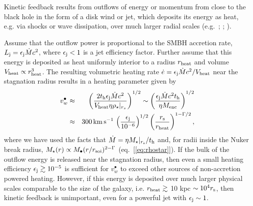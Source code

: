 \documentclass[usenatbib,fleqn]{mn2e}
\begin{document}
Kinetic feedback results from outflows of energy or momentum from close to the black hole in the form of a disk wind or jet, which deposits its energy as heat, e.g. via shocks or wave dissipation, over much larger radial scales (e.g.~\citealt{McNamara&Nulsen07}; \citealt{Novak+11}; \citealt{Gaspari+12}).  

Assume that the outflow power is proportional to the SMBH accretion rate, $L_{\rm j} =
\epsilon_{\rm j} \dot{M}c^{2}$, where $\epsilon_{\rm j} < 1$ is a jet efficiency factor.  Further assume that this energy is deposited as heat uniformly interior to a radius $r_{\rm heat}$ and volume $V_{\rm heat} \propto r_{\rm
heat}^{3}$.  The resulting volumetric heating rate $\dot{e} = \epsilon_{\rm
j}\dot{M}c^{2}/V_{\rm heat}$ near the stagnation radius results in a heating parameter given by
\begin{eqnarray} v_{w}^{\bullet} &\approx& \left(\frac{2t_{\rm
h}\epsilon_{\rm j}\dot{M}c^{2}}{V_{\rm heat}\eta
\rho_{\star}|_{r_{s}}}\right)^{1/2} \sim \left(\frac{\epsilon_{\rm
j}\dot{M}c^{2}t_{\rm h}}{\eta M_{\rm enc}}\right)^{1/2} \nonumber \\
&\approx& 300\,{\rm km\,s^{-1}}\,\left(\frac{\epsilon_{\rm j}}{10^{-6}}\right)^{1/2}\left(\frac{r_{\rm s}}{r_{\rm
heat}}\right)^{1-\Gamma/2},
\label{eq:vjet}
\end{eqnarray} 
where we have used the facts that $\dot{M} = \eta M_{\star}|_{r_{\rm s}}/t_{\rm h}$ and, for radii inside the Nuker break radius, $M_{\star}(r) \propto
M_{\bullet}(r/r_{\rm soi})^{2-\Gamma}$ (eq.~[\ref{eq:rhostar}]).  If the bulk of the outflow energy is released near the stagnation radius, then even a small heating efficiency $\epsilon_{\rm j} \gtrsim
10^{-5}$ is sufficient for $v_{w}^{\bullet}$ to exceed other sources of non-accretion powered heating.  However, if this energy is deposited over much larger physical scales comparable to the size of the galaxy, i.e. $r_{\rm heat} \gtrsim $ 10 kpc $\sim 10^{4}r_{\rm s}$, then kinetic feedback is unimportant, even for a powerful jet with $\epsilon_{\rm j} \sim 1$.  
\end{document}
